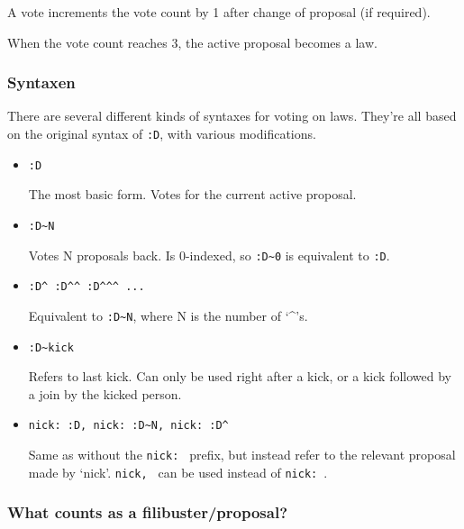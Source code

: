 \documentclass[11pt]{article}
\begin{document}
A vote increments the vote count by 1 after change of proposal (if required).

When the vote count reaches 3, the active proposal becomes a law.


\subsubsection{Syntaxen}
There are several different kinds of syntaxes for voting on laws. They're all based
on the original syntax of \texttt{:D}, with various modifications.

\begin{itemize}
\item \texttt{:D}

The most basic form. Votes for the current active proposal.

\item \texttt{:D\~{}N}

Votes N proposals back. Is 0-indexed, so \texttt{:D\~{}0} is equivalent to \texttt{:D}.

\item \texttt{:D\^{} :D\^{}\^{} :D\^{}\^{}\^{} ...}

Equivalent to \texttt{:D\~{}N}, where N is the number of `\^{}'s.

\item \texttt{:D\~{}kick}

Refers to last kick. Can only be used right after a kick, or a kick followed by a join
by the kicked person.

\item \texttt{nick: :D, nick: :D\~{}N, nick: :D\^{}}

Same as without the \texttt{nick: } prefix, but instead refer to the relevant proposal
made by `nick'. \texttt{nick, } can be used instead of \texttt{nick: }.
\end{itemize}


\subsubsection{What counts as a filibuster/proposal?}
\end{document}
